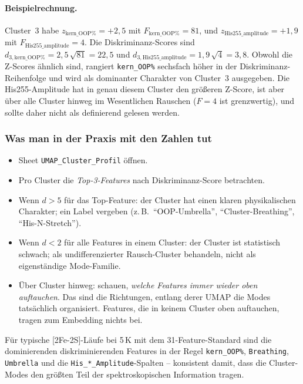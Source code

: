 \documentclass[11pt,a4paper,twoside]{article}
\theoremstyle{remark}
\begin{document}
\paragraph{Beispielrechnung.}
Cluster~3 habe
$z_{\text{kern\_OOP}\%} = +2{,}5$ mit $F_{\text{kern\_OOP}\%} = 81$,
und $z_{\text{His255\_amplitude}} = +1{,}9$ mit
$F_{\text{His255\_amplitude}} = 4$.
Die Diskriminanz-Scores sind
$d_{3,\text{kern\_OOP}\%} = 2{,}5\,\sqrt{81} = 22{,}5$ und
$d_{3,\text{His255\_amplitude}} = 1{,}9\,\sqrt{4} = 3{,}8$.
Obwohl die Z-Scores \"ahnlich sind, rangiert \texttt{kern\_OOP\%}
sechsfach h\"oher in der Diskriminanz-Reihenfolge und wird als
dominanter Charakter von Cluster~3 ausgegeben. Die His255-Amplitude
hat in genau diesem Cluster den gr\"o\ss eren Z-Score, ist aber
\"uber alle Cluster hinweg im Wesentlichen Rauschen ($F = 4$ ist
grenzwertig), und sollte daher nicht als definierend gelesen
werden.

\subsubsection*{Was man in der Praxis mit den Zahlen tut}

\begin{itemize}\setlength{\itemsep}{2pt}
  \item Sheet \texttt{UMAP\_Cluster\_Profil} \"offnen.
  \item Pro Cluster die \emph{Top-3-Features} nach
        Diskriminanz-Score betrachten.
  \item Wenn $d > 5$ f\"ur das Top-Feature: der Cluster hat einen
        klaren physikalischen Charakter; ein Label vergeben
        (z.\,B.\ ``OOP-Umbrella'', ``Cluster-Breathing'',
        ``His-N-Stretch'').
  \item Wenn $d < 2$ f\"ur alle Features in einem Cluster: der
        Cluster ist statistisch schwach; als undifferenzierter
        Rausch-Cluster behandeln, nicht als eigenst\"andige
        Mode-Familie.
  \item \"Uber Cluster hinweg: schauen, \emph{welche Features
        immer wieder oben auftauchen}. Das sind die Richtungen,
        entlang derer UMAP die Modes tats\"achlich organisiert.
        Features, die in keinem Cluster oben auftauchen, tragen
        zum Embedding nichts bei.
\end{itemize}

F\"ur typische [2Fe-2S]-L\"aufe bei 5\,K mit dem 31-Feature-Standard
sind die dominierenden diskriminierenden Features in der Regel
\texttt{kern\_OOP\%}, \texttt{Breathing}, \texttt{Umbrella} und die
\texttt{His\_*\_Amplitude}-Spalten -- konsistent damit, dass die
Cluster-Modes den gr\"o\ss ten Teil der spektroskopischen
Information tragen.
\end{document}
